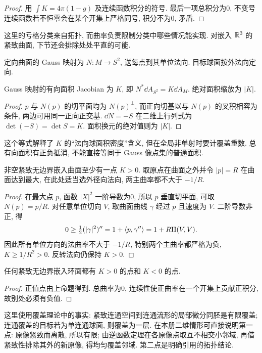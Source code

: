 \begin{proof}
用 $\int K=4\pi(1-g)$ 及连续函数积分的符号. 最后一项总积分为0, 不变号连续函数若不恒零会在某个开集上严格同号, 积分不为0, 矛盾.
\end{proof}
这里的亏格分类来自拓扑, 而曲率负责限制分类中哪些情况能实现. 对嵌入 $\mathbb R^3$ 的紧致曲面, 下节还会排除处处平直的可能.
\begin{definition}
定向曲面的 Gauss 映射为 $N:M\to S^2$, 送每点到其单位法向. 目标球面按外法向定向.
\end{definition}
\begin{proposition}\label{prop:gauss-jacobian}
Gauss 映射的有向面积 Jacobian 为 $K$, 即 $N^*\dd A_{S^2}=K\dd A_M$. 绝对面积缩放为 $|K|$.
\end{proposition}
\begin{proof}
$p$ 与 $N(p)$ 的切平面均为 $N(p)^\perp$, 而正向切基以与 $N(p)$ 的叉积相容为条件, 两边可用同一正向正交基. $\dd N=-S$ 在二维上行列式为 $\det(-S)=\det S=K$. 面积换元的绝对值则为 $|K|$.
\end{proof}
这个等式解释了 $K$ 的“法向球面积密度”含义, 但在全局非单射时要计覆盖重数. 总有向面积有正负抵消, 不能直接等同于 Gauss 像点集的普通面积.
\begin{proposition}\label{prop:elliptic-point}
非空紧致无边界嵌入曲面至少有一点 $K>0$. 取原点在曲面之外并令 $|p|=R$ 在曲面达到最大, 在此处适当选外径向法向, 两主曲率都不大于 $-1/R$.
\end{proposition}
\begin{proof}
在最大点 $p$, 函数 $|X|^2$ 一阶导数为0, 所以 $p$ 垂直切平面, 可取 $N(p)=p/R$. 对任意单位切向 $V$, 取曲面曲线 $\gamma$ 经过 $p$ 且速度为 $V$. 二阶导数非正, 得
\[
 0\ge\tfrac12(|\gamma|^2)''=1+\langle p,\gamma''\rangle
 =1+R\mathrm{II}(V,V).
\]
因此所有单位方向的法曲率不大于 $-1/R$, 特别两个主曲率都严格为负, $K\ge1/R^2>0$. 反转法向仍保持 $K>0$.
\end{proof}
\begin{corollary}
任何紧致无边界嵌入环面都有 $K>0$ 的点和 $K<0$ 的点.
\end{corollary}
\begin{proof}
正值点由上命题得到. 总曲率为0, 连续性使正曲率在一个开集上贡献正积分, 故别处必须有负值.
\end{proof}
这里使用覆盖理论中的事实: 紧致连通空间到连通流形的局部微分同胚是有限覆盖; 连通覆盖的目标若为单连通球面, 则覆盖为一层. 在本册二维情形可直接说明第一点: 原像紧致而离散, 所以有限; 由逆函数定理在各原像点取互不相交小邻域, 再借紧致性排除其外的新原像, 得均匀覆盖邻域. 第二点是明确引用的拓扑结论.
